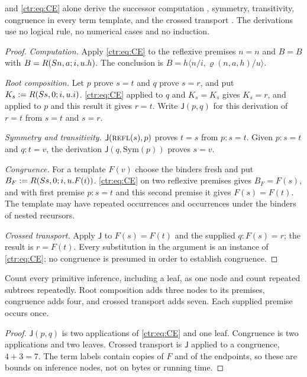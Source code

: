 \begin{theorem}\label{ctr:thm:arith}
 and \eqref{ctr:eq:CE} alone derive the successor computation
, symmetry, transitivity, congruence in every term template, and the crossed
transport . The derivations use no logical rule, no numerical cases and no
induction.
\end{theorem}
\begin{proof}
\emph{Computation.} Apply \eqref{ctr:eq:CE} to the reflexive premises $n=n$ and $B=B$ with
$B=R(S n,a;i,u.h)$. The conclusion is $B=h\langle n/i,\varrho(n,a,h)/u\rangle$.

\emph{Root composition.} Let $p$ prove $s=t$ and $q$ prove $s=r$, and put
$K_s\mathrel{:=} R(S s,0;i,u.i)$. \eqref{ctr:eq:CE} applied to $q$ and $K_s=K_s$ gives
$K_s=r$, and applied to $p$ and this result it gives $r=t$. Write
$\mathsf J(p,q)$ for this derivation of $r=t$ from $s=t$ and $s=r$.

\emph{Symmetry and transitivity.} $\mathsf J(\rulename{Refl}(s),p)$ proves $t=s$ from
$p\colon s=t$. Given $p\colon s=t$ and $q\colon t=v$, the derivation
$\mathsf J(q,\mathrm{Sym}(p))$ proves $s=v$.

\emph{Congruence.} For a template $F(v)$ choose the binders fresh and put
$B_F\mathrel{:=} R(S s,0;i,u.F(i))$. \eqref{ctr:eq:CE} on two reflexive premises gives
$B_F=F(s)$, and with first premise $p\colon s=t$ and this second premise it gives
$F(s)=F(t)$. The template may have repeated occurrences and occurrences under the binders of
nested recursors.

\emph{Crossed transport.} Apply $\mathsf J$ to $F(s)=F(t)$ and the supplied $q\colon F(s)=r$;
the result is $r=F(t)$. Every substitution in the argument is an instance of
\eqref{ctr:eq:CE}; no congruence is presumed in order to establish congruence.
\end{proof}

\begin{proposition}\label{ctr:prop:cost}
Count every primitive inference, including a  leaf, as one node and count
repeated subtrees repeatedly. Root composition adds three nodes to its premises, congruence
adds four, and crossed transport adds seven. Each supplied premise occurs once.
\end{proposition}
\begin{proof}
$\mathsf J(p,q)$ is two applications of \eqref{ctr:eq:CE} and one leaf. Congruence is two
applications and two leaves. Crossed transport is $\mathsf J$ applied to a congruence,
$4+3=7$. The term labels contain copies of $F$ and of the endpoints, so these are bounds on
inference nodes, not on bytes or running time.
\end{proof}

